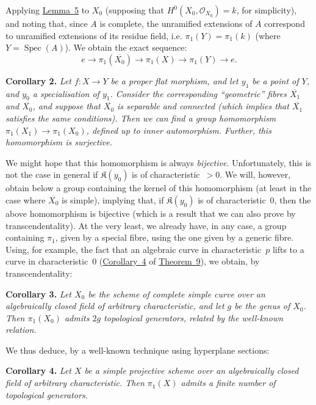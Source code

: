\documentclass{article}
\newenvironment{itenv}[1]
  {\phantomsection\par\medskip\noindent\textbf{#1.}\itshape}
  {\par\medskip}
\newcommand{\scr}[1]{{\mathscr{#1}}}
\newcommand{\kres}{\mathfrak{K}}
\DeclareMathOperator{\Spec}{Spec}
\newcommand{\oldpage}[1]{\marginpar{\footnotesize$\Big\vert$ \textit{p.~#1}}}
\begin{document}
Applying \hyperref[lemma5]{Lemma~5} to $X_0$ (supposing that $H^0(X_0,\scr{O}_{X_0})=k$, for simplicity), and noting that, since $A$ is complete, the unramified extensions of $A$ correspond to unramified extensions of its residue field, i.e. $\pi_1(Y)=\pi_1(k)$ (where $Y=\Spec(A)$).
We obtain the exact sequence:
\[
  e \to \pi_1(\overline{X_0}) \to \pi_1(X) \to \pi_1(Y) \to e.
\]

\begin{itenv}{Corollary 2}
\label{theorem12corollary2}
  Let $f\colon X\to Y$ be a proper flat morphism, and let $y_1$ be a point of $Y$, and $y_0$ a specialisation of $y_1$.
  Consider the corresponding ``geometric'' fibres $\overline{X_1}$ and $\overline{X_0}$, and suppose that $\overline{X_0}$ is separable and connected (which implies that $\overline{X_1}$ satisfies the same conditions).
  Then we can find a group homomorphism $\pi_1(X_1)\to\pi_1(X_0)$, defined up to inner automorphism.
  Further, this homomorphism is \emph{surjective}.
\end{itenv}

\oldpage{182-25}
We might hope that this homomorphism is always \emph{bijective}.
Unfortunately, this is not the case in general if $\kres(y_0)$ is of characteristic~$>0$.
We will, however, obtain below a group containing the kernel of this homomorphism (at least in the case where $\overline{X_0}$ is simple), implying that, if $\kres(y_0)$ is of characteristic~$0$, then the above homomorphism is bijective (which is a result that we can also prove by transcendentality).
At the very least, we already have, in any case, a group containing $\pi_1$, given by a special fibre, using the one given by a generic fibre.
Using, for example, the fact that an algebraic curve in characteristic~$p$ lifts to a curve in characteristic~$0$ (\hyperref[theorem9corollary4]{Corollary~4} of \hyperref[theorem9]{Theorem~9}), we obtain, by transcendentality:

\begin{itenv}{Corollary 3}
\label{theorem12corollary3}
  Let $X_0$ be the scheme of complete simple curve over an algebraically closed field of arbitrary characteristic, and let $g$ be the genus of $X_0$.
  Then $\pi_1(X_0)$ admits $2g$ topological generators, related by the well-known relation.
\end{itenv}

We thus deduce, by a well-known technique using hyperplane sections:

\begin{itenv}{Corollary 4}
\label{theorem12corollary4}
  Let $X$ be a simple projective scheme over an algebraically closed field of arbitrary characteristic.
  Then $\pi_1(X)$ admits a finite number of topological generators.
\end{itenv}
\end{document}
